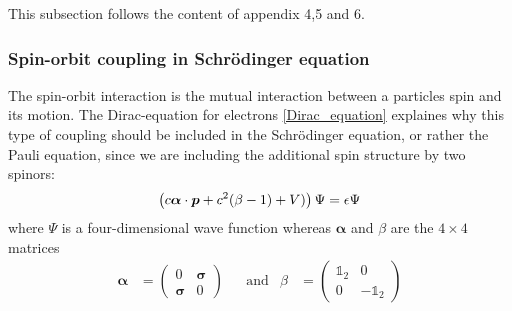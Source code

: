 	This subsection follows the content of \cite{tutorial2} appendix 4,5 and 6. 

\subsubsection{Spin-orbit coupling in Schrödinger equation}
	
	The spin-orbit interaction is the mutual interaction between a particles spin and its motion. 
	The Dirac-equation for electrons \eqref{Dirac_equation} explaines why this type of coupling should be included in the Schrödinger equation, or rather the Pauli equation, since we are including the additional spin structure by two spinors: 
	\begin{equation} \label{Dirac_equation}
		\left(
			c \boldsymbol\alpha \cdot \boldsymbol{p} + c^2(\beta - 1) + V) 
		\right) \Psi = \epsilon \Psi
	\end{equation}
	where $\Psi$ is a four-dimensional wave function whereas $\boldsymbol{\alpha}$ and $\beta$ are the $4 \times 4$ matrices
	\begin{align}
		\boldsymbol\alpha &= 
		\begin{pmatrix}
			0 & \boldsymbol{\sigma} \\
			\boldsymbol{\sigma} & 0
		\end{pmatrix} & &\text{and} &
		\beta &= 
		\begin{pmatrix}
		\mathds{1}_2 & 0 \\
		0 & -\mathds{1}_2
		\end{pmatrix}
	\end{align}
